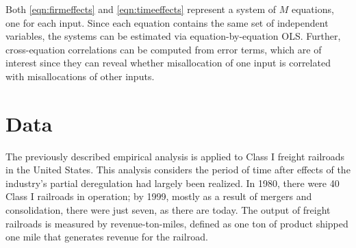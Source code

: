 \documentclass[twocolumn]{article}
\begin{document}
Both \cref{eqn:firmeffects} and \cref{eqn:timeeffects} represent a system of $M$ equations, one for each input. Since each equation contains the same set of independent variables, the systems can be estimated via equation-by-equation OLS. Further, cross-equation correlations can be computed from error terms, which are of interest since they can reveal whether misallocation of one input is correlated with misallocations of other inputs.

\section{Data}

The previously described empirical analysis is applied to Class I freight railroads in the United States. This analysis considers the period of time after effects of the industry's partial deregulation had largely been realized. In 1980, there were 40 Class I railroads in operation; by 1999, mostly as a result of mergers and consolidation, there were just seven, as there are today. The output of freight railroads is measured by revenue-ton-miles, defined as one ton of product shipped one mile that generates revenue for the railroad. 



\end{document}
